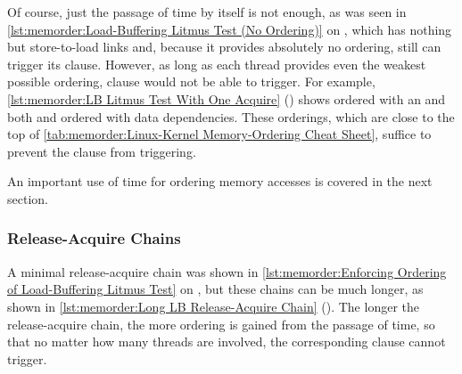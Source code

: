 Of course, just the passage of time by itself is not enough, as
was seen in
\cref{lst:memorder:Load-Buffering Litmus Test (No Ordering)}
on
,
which has nothing but store-to-load links and, because it provides
absolutely no ordering, still can trigger its  clause.
However, as long as each thread provides even the weakest possible
ordering,  clause would not be able to trigger.
For example,
\cref{lst:memorder:LB Litmus Test With One Acquire}
()
shows  ordered with an  and
both  and  ordered with data dependencies.
These orderings, which are close to the top of
\cref{tab:memorder:Linux-Kernel Memory-Ordering Cheat Sheet},
suffice to prevent the  clause from triggering.

\QuickQuizEnd

An important use of time for ordering memory accesses is covered in the
next section.

\subsubsection{Release-Acquire Chains}
\label{sec:memorder:Release-Acquire Chains}

A minimal release-acquire chain was shown in
\cref{lst:memorder:Enforcing Ordering of Load-Buffering Litmus Test}
on
,
but these chains can be much longer, as shown in
\cref{lst:memorder:Long LB Release-Acquire Chain}
().
The longer the release-acquire chain, the more ordering is gained
from the passage of time, so that no matter how many threads are
involved, the corresponding  clause cannot trigger.


